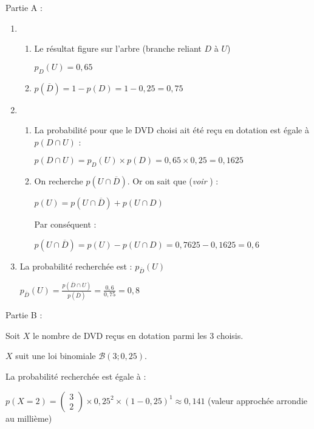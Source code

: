 \begin{corrige}
     \begin{h3}Partie A :\end{h3}
     \begin{enumerate}
          \item
          \begin{enumerate}[label=\alph*.]
               \item
               Le résultat figure sur l'arbre (branche reliant $D$ à $U$)
               \par
               $p_{D}\left(U\right)=0,65$
               \item
               $p\left(\overline{D}\right)=1-p\left(D\right)=1-0,25=0,75$
          \end{enumerate}
          \item
          \begin{enumerate}[label=\alph*.]
               \item
               La probabilité pour que le DVD choisi ait été reçu en dotation est égale à $p\left(D \cap  U\right)$ :
               \par
               $p\left(D \cap  U\right)=p_{D}\left(U\right) \times p\left(D\right)=0,65 \times 0,25=0,1625$
               \item
               On recherche $p\left(U \cap  \overline{D}\right)$. Or on sait que (\textit{voir }) :
               \par
               $p\left(U\right)=p\left(U \cap  \overline{D}\right)+p\left(U \cap  D\right)$
               \par
               Par conséquent :
               \par
               $p\left(U \cap  \overline{D}\right)=p\left(U\right)-p\left(U \cap  D\right)=0,7625-0,1625=0,6$
          \end{enumerate}
          \item
          La probabilité recherchée est : $p_{\overline{D}}\left(U\right)$
          \par
          $p_{\overline{D}}\left(U\right)=\frac{p\left(\overline{D} \cap  U\right)}{p\left(\overline{D}\right)}=\frac{0,6}{0,75}=0,8$
     \end{enumerate}
     \begin{h3}Partie B :\end{h3}
     Soit $X$ le nombre de DVD reçus en dotation parmi les 3 choisis.
     \par
     $X$ suit une loi binomiale $\mathscr B\left(3; 0,25\right)$.
     \par
     La probabilité recherchée est  égale à :
     \par
     $p(X=2)=\begin{pmatrix} 3 \\ 2 \end{pmatrix}\times 0,25^{2}\times \left(1-0,25\right)^{1}\approx 0,141$ (valeur approchée arrondie au millième)
\end{corrige}
